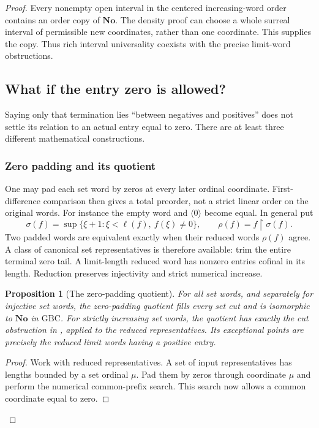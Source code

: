 \documentclass[11pt]{article}
\newtheorem{proposition}[proposition]{Proposition}
\theoremstyle{definition}
\theoremstyle{remark}
\newcommand{\No}{\mathbf{No}}
\begin{document}
\begin{proof}
Every nonempty open interval in the centered increasing-word order
contains an order copy of \(\No\).  The density proof can choose a
whole surreal interval of permissible new coordinates, rather than
one coordinate.  This supplies the copy.  Thus rich interval
universality coexists with the precise limit-word obstructions.

\subsection{What if the entry zero is allowed?}
\label{swo:sh:wv:zero}

Saying only that termination lies ``between negatives and positives''
does not settle its relation to an actual entry equal to zero.
There are at least three different mathematical constructions.

\subsubsection{Zero padding and its quotient}

One may pad each set word by zeros at every later ordinal coordinate.
First-difference comparison then gives a total preorder, not a strict
linear order on the original words.  For instance the empty word
and \(\langle0\rangle\) become equal.  In general put
\[
 \sigma(f)=\sup\{\xi+1:\xi<\ell(f),\ f(\xi)\ne0\},\qquad
 \rho(f)=f\restriction\sigma(f).
\]
Two padded words are equivalent exactly when their reduced words
\(\rho(f)\) agree.  A class of canonical set representatives is
therefore available: trim the entire terminal zero tail.  A
limit-length reduced word has nonzero entries cofinal in its length.
Reduction preserves injectivity and strict numerical increase.

\begin{proposition}[The zero-padding quotient]
\label{swo:sh:wv:zero-quotient}
For all set words, and separately for injective set words, the
zero-padding quotient fills every set cut and is isomorphic to
\(\No\) in \(\mathrm{GBC}\).
For strictly increasing set words, the quotient has exactly the
cut obstruction in , applied to the reduced
representatives.  Its exceptional points are precisely the reduced
limit words having a positive entry.
\end{proposition}

\begin{proof}
Work with reduced representatives.  A set of input representatives
has lengths bounded by a set ordinal \(\mu\).  Pad them by zeros
through coordinate \(\mu\) and perform the numerical common-prefix
search.  This search now allows a common coordinate equal to zero.


\end{proof}
\end{proof}
\end{document}
